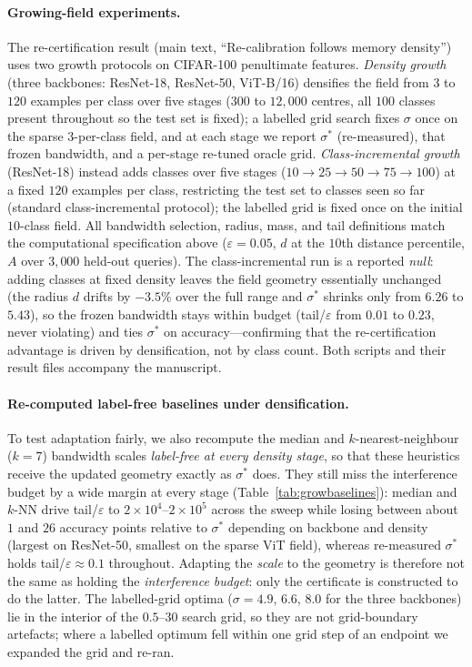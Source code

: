 \documentclass[10pt,twocolumn]{article}
\newcommand{\sstar}{\sigma^{*}}
\begin{document}
\paragraph{Growing-field experiments.} The re-certification result (main text, ``Re-calibration follows memory density'') uses two growth protocols on CIFAR-100 penultimate features. \emph{Density growth} (three backbones: ResNet-18, ResNet-50, ViT-B/16) densifies the field from $3$ to $120$ examples per class over five stages ($300$ to $12{,}000$ centres, all $100$ classes present throughout so the test set is fixed); a labelled grid search fixes $\sigma$ once on the sparse $3$-per-class field, and at each stage we report $\sstar$ (re-measured), that frozen bandwidth, and a per-stage re-tuned oracle grid. \emph{Class-incremental growth} (ResNet-18) instead adds classes over five stages ($10\!\to\!25\!\to\!50\!\to\!75\!\to\!100$) at a fixed $120$ examples per class, restricting the test set to classes seen so far (standard class-incremental protocol); the labelled grid is fixed once on the initial $10$-class field. All bandwidth selection, radius, mass, and tail definitions match the computational specification above ($\varepsilon=0.05$, $d$ at the $10$th distance percentile, $A$ over $3{,}000$ held-out queries). The class-incremental run is a reported \emph{null}: adding classes at fixed density leaves the field geometry essentially unchanged (the radius $d$ drifts by $-3.5\%$ over the full range and $\sstar$ shrinks only from $6.26$ to $5.43$), so the frozen bandwidth stays within budget (tail/$\varepsilon$ from $0.01$ to $0.23$, never violating) and ties $\sstar$ on accuracy---confirming that the re-certification advantage is driven by densification, not by class count. Both scripts and their result files accompany the manuscript.

\paragraph{Re-computed label-free baselines under densification.} To test adaptation fairly, we also recompute the median and $k$-nearest-neighbour ($k=7$) bandwidth scales \emph{label-free at every density stage}, so that these heuristics receive the updated geometry exactly as $\sstar$ does. They still miss the interference budget by a wide margin at every stage (Table~\ref{tab:growbaselines}): median and $k$-NN drive tail/$\varepsilon$ to $2\times10^4$--$2\times10^5$ across the sweep while losing between about $1$ and $26$ accuracy points relative to $\sstar$ depending on backbone and density (largest on ResNet-50, smallest on the sparse ViT field), whereas re-measured $\sstar$ holds tail/$\varepsilon\approx0.1$ throughout. Adapting the \emph{scale} to the geometry is therefore not the same as holding the \emph{interference budget}: only the certificate is constructed to do the latter. The labelled-grid optima ($\sigma=4.9$, $6.6$, $8.0$ for the three backbones) lie in the interior of the $0.5$--$30$ search grid, so they are not grid-boundary artefacts; where a labelled optimum fell within one grid step of an endpoint we expanded the grid and re-ran.
\end{document}
